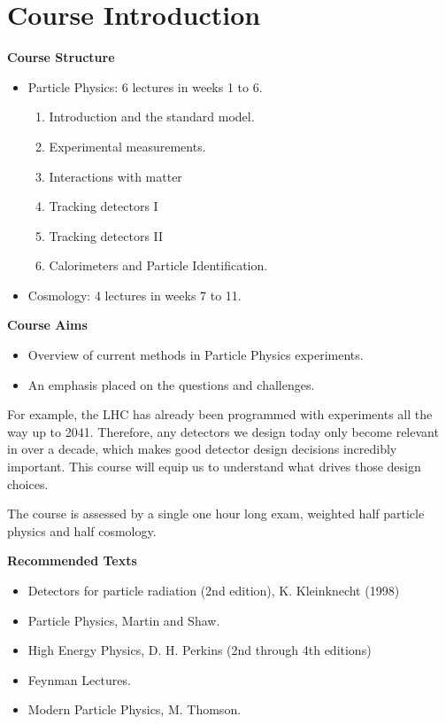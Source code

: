 
\section{Course Introduction}
\textbf{Course Structure}
\begin{itemize}
    \item Particle Physics: 6 lectures in weeks 1 to 6.
    \begin{enumerate}
        \item Introduction and the standard model.
        \item Experimental measurements.
        \item Interactions with matter
        \item Tracking detectors I
        \item Tracking detectors II
        \item Calorimeters and Particle Identification.
    \end{enumerate}
    
    \item Cosmology: 4 lectures in weeks 7 to 11.
\end{itemize}

\textbf{Course Aims}
\begin{itemize}
    \item Overview of current methods in Particle Physics experiments.
    \item An emphasis placed on the questions and challenges.
\end{itemize}

For example, the LHC has already been programmed with experiments all the way up to 2041. Therefore, any detectors we design today only become relevant in over a decade, which makes good detector design decisions incredibly important. This course will equip us to understand what drives those design choices.

The course is assessed by a single one hour long exam, weighted half particle physics and half cosmology.

\textbf{Recommended Texts}
\begin{itemize}
    \item Detectors for particle radiation (2nd edition), K. Kleinknecht (1998)
    \item Particle Physics, Martin and Shaw.
    \item High Energy Physics, D. H. Perkins (2nd through 4th editions)
    \item Feynman Lectures.
    \item Modern Particle Physics, M. Thomson.
\end{itemize}

